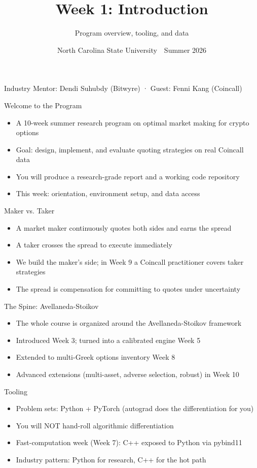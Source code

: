 \documentclass[aspectratio=169,11pt]{beamer}
\title{Week 1: Introduction}
\subtitle{Program overview, tooling, and data}
\date{North Carolina State University \,\textbar\, Summer 2026}
\begin{document}
\begin{frame}[plain]\titlepage
\begin{center}\tiny Industry Mentor: Dendi Suhubdy (Bitwyre)  ·  Guest: Fenni Kang (Coincall)\end{center}\end{frame}
\begin{frame}{Welcome to the Program}
\begin{itemize}
  \item A 10-week summer research program on optimal market making for crypto options
  \item Goal: design, implement, and evaluate quoting strategies on real Coincall data
  \item You will produce a research-grade report and a working code repository
  \item This week: orientation, environment setup, and data access
\end{itemize}\end{frame}
\begin{frame}{Maker vs. Taker}
\begin{itemize}
  \item A market maker continuously quotes both sides and earns the spread
  \item A taker crosses the spread to execute immediately
  \item We build the maker's side; in Week 9 a Coincall practitioner covers taker strategies
  \item The spread is compensation for committing to quotes under uncertainty
\end{itemize}\end{frame}
\begin{frame}{The Spine: Avellaneda-Stoikov}
\begin{itemize}
  \item The whole course is organized around the Avellaneda-Stoikov framework
  \item Introduced Week 3; turned into a calibrated engine Week 5
  \item Extended to multi-Greek options inventory Week 8
  \item Advanced extensions (multi-asset, adverse selection, robust) in Week 10
\end{itemize}\end{frame}
\begin{frame}{Tooling}
\begin{itemize}
  \item Problem sets: Python + PyTorch (autograd does the differentiation for you)
  \item You will NOT hand-roll algorithmic differentiation
  \item Fast-computation week (Week 7): C++ exposed to Python via pybind11
  \item Industry pattern: Python for research, C++ for the hot path
\end{itemize}\end{frame}
\end{document}
